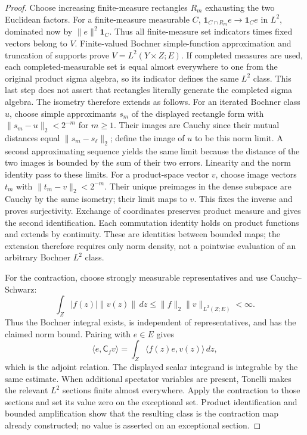 \documentclass[11pt,a4paper]{article}
\theoremstyle{definition}
\theoremstyle{remark}
\begin{document}
\begin{proof}
Choose increasing finite-measure rectangles $R_m$ exhausting the
two Euclidean factors. For a finite-measure measurable $C$,
$\mathbf1_{C\cap R_m}e\to\mathbf1_Ce$ in $L^2$, dominated now by
$\|e\|^2\mathbf1_C$. Thus all finite-measure set indicators times
fixed vectors belong to $V$. Finite-valued Bochner simple-function
approximation and truncation of supports prove $V=L^2(Y\times Z;E)$.
If completed measures are used, each completed-measurable set is
equal almost everywhere to one from the original product sigma
algebra, so its indicator defines the same $L^2$ class. This last
step does not assert that rectangles literally generate the
completed sigma algebra. The
isometry therefore extends as follows. For an iterated Bochner
class $u$, choose simple approximants $s_m$ of the displayed
rectangle form with $\|s_m-u\|_2<2^{-m}$ for $m\geq1$.
Their images are Cauchy since their mutual distances equal
$\|s_m-s_\ell\|_2$; define the image of $u$ to be this norm
limit. A second approximating sequence yields the same limit
because the distance of the two images is bounded by the sum
of their two errors. Linearity and the norm identity pass to
these limits. For a product-space vector $v$, choose image
vectors $t_m$ with $\|t_m-v\|_2<2^{-m}$. Their unique
preimages in the dense subspace are Cauchy by the same isometry;
their limit maps to $v$. This fixes the inverse and proves
surjectivity. Exchange of coordinates
preserves product measure and gives the second identification.
Each commutation identity holds on product functions and extends
by continuity. These are identities between bounded maps; the extension
therefore requires only norm density, not a pointwise evaluation of an
arbitrary Bochner $L^2$ class.

For the contraction, choose strongly measurable representatives and use
Cauchy--Schwarz:
\[
 \int_Z |f(z)|\|v(z)\|\,dz
       \leq\|f\|_2\|v\|_{L^2(Z;E)}<\infty.
\]
Thus the Bochner integral exists, is independent of representatives,
and has the claimed norm bound. Pairing with $e\in E$ gives
\[
 \langle e,\mathsf C_fv\rangle
   =\int_Z\langle f(z)e,v(z)\rangle\,dz,
\]
which is the adjoint relation. The displayed scalar integrand is
integrable by the same estimate. When additional spectator variables
are present, Tonelli makes the relevant $L^2$ sections finite almost
everywhere. Apply the contraction to those sections and set its value
zero on the exceptional set. Product identification and bounded
amplification show that the resulting class is the contraction map
already constructed; no value is asserted on an exceptional section.


\end{proof}
\end{document}
